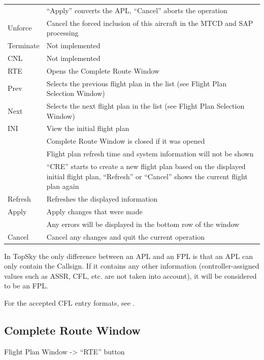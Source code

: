 \documentclass[a4paper,oneside,11pt]{memoir}
\begin{document}
\begin{longtable}{p{1.5cm} p{11cm}}
                & “Apply” converts the APL, “Cancel” aborts the operation\\
    Unforce     & Cancel the forced inclusion of this aircraft in the MTCD and SAP processing\\
    Terminate   & Not implemented\\
    CNL         & Not implemented\\
    RTE         & Opens the Complete Route Window\\
    Prev        & Selects the previous flight plan in the list (see Flight Plan Selection Window)\\
    Next        & Selects the next flight plan in the list (see Flight Plan Selection Window)\\
    INI         & View the initial flight plan\\
                & Complete Route Window is closed if it was opened\\
                & Flight plan refresh time and system information will not be shown\\
                & “CRE” starts to create a new flight plan based on the displayed initial flight plan, “Refresh” or “Cancel” shows the current flight plan again\\
    Refresh     & Refreshes the displayed information\\
    Apply       & Apply changes that were made\\
                & Any errors will be displayed in the bottom row of the window\\
    Cancel      & Cancel any changes and quit the current operation\\
\end{longtable}

\bigskip

In TopSky the only difference between an APL and an FPL is that an APL can only contain the Callsign. If it contains any other information (controller-assigned values such as ASSR, CFL, etc. are not taken into account), it will be considered to be an FPL.

\bigskip

For the accepted CFL entry formats, see .

\subsection{Complete Route Window}
\label{win:crw}

Flight Plan Window -> “RTE” button
\end{document}
